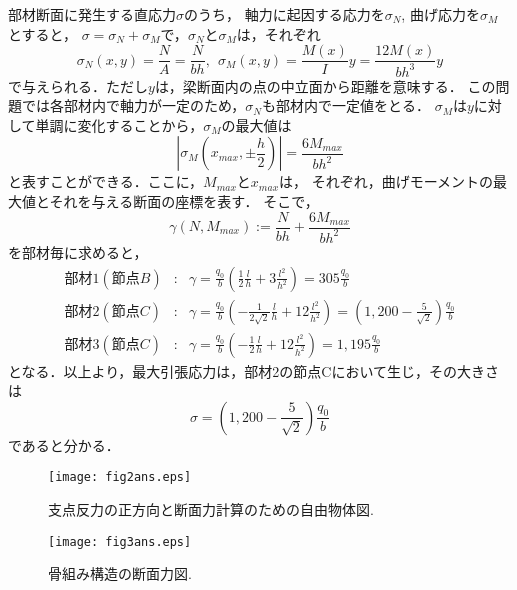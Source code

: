 ﻿\documentclass[10pt,a4j]{jarticle}
\begin{document}
\begin{enumerate}
部材断面に発生する直応力$\sigma$のうち，
軸力に起因する応力を$\sigma_N$, 曲げ応力を$\sigma_M$とすると，
$\sigma=\sigma_N+\sigma_M$で，$\sigma_N$と$\sigma_M$は，それぞれ
\begin{equation}
	\sigma_N(x,y)=\frac{N}{A}=\frac{N}{bh}, \ \
	\sigma_M(x,y)=\frac{M(x)}{I}y=\frac{12M(x)}{bh^3}y
	\label{eqn:}
\end{equation}
で与えられる．ただし$y$は，梁断面内の点の中立面から距離を意味する．
この問題では各部材内で軸力が一定のため，$\sigma_N$も部材内で一定値をとる．
$\sigma_M$は$y$に対して単調に変化することから，$\sigma_M$の最大値は
\begin{equation}
	\left| \sigma_M\left(x_{max},\pm \frac{h}{2}\right)\right|=\frac{6M_{max}}{bh^2}
	\label{eqn:eq_lbl}
\end{equation}
と表すことができる．ここに，$M_{max}$と$x_{max}$は，
それぞれ，曲げモーメントの最大値とそれを与える断面の座標を表す．
そこで，
\begin{equation}
	\gamma(N,M_{max}):=\frac{N}{bh}+\frac{6M_{max}}{bh^2}
	\label{eqn:cost}
\end{equation}
を部材毎に求めると，
\begin{eqnarray}
	部材1(節点B) &:& \gamma=\frac{q_0}{b}\left( \frac{1}{2}\frac{l}{h}+3\frac{l^2}{h^2}\right)=305\frac{q_0}{b}\\
	部材2(節点C) &:& \gamma=\frac{q_0}{b}\left( -\frac{1}{2\sqrt{2}}\frac{l}{h}+12\frac{l^2}{h^2}\right)=
	\left(1,200-\frac{5}{\sqrt{2}}\right)\frac{q_0}{b}\\
	部材3(節点C) &:& \gamma=\frac{q_0}{b}\left( -\frac{1}{2}\frac{l}{h}+12\frac{l^2}{h^2}\right)=1,195\frac{q_0}{b}
	\label{eqn:Hvals}
\end{eqnarray}
となる．以上より，最大引張応力は，部材2の節点Cにおいて生じ，その大きさは
\begin{equation}
	\sigma=\left(1,200-\frac{5}{\sqrt{2}}\right)\frac{q_0}{b}
	\label{eqn:sig_max}
\end{equation}
であると分かる．
\end{enumerate}
\begin{figure}[h]
	\begin{center}
	\texttt{[image: fig2ans.eps]} 
	\end{center}
	\caption{支点反力の正方向と断面力計算のための自由物体図.} 
	\label{fig:fig2}
\end{figure}
\begin{figure}[h]
	\begin{center}
	\texttt{[image: fig3ans.eps]} 
	\end{center}
	\caption{骨組み構造の断面力図.} 
	\label{fig:fig3}
\end{figure}
\end{document}

